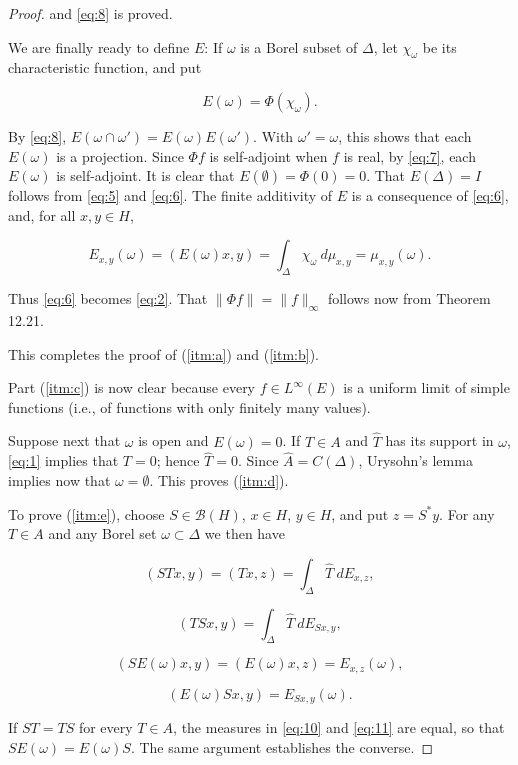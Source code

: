 \begin{proof}
  and \eqref{eq:8} is proved.

  We are finally ready to define \( E \): If \( \omega \) is a Borel subset of \( \Delta \), let
  \( \chi_{\omega} \) be its characteristic function, and put

  \[
    E(\omega) = \Phi(\chi_{\omega}).
  \]

  By \eqref{eq:8}, \( E(\omega \cap \omega') = E(\omega)E(\omega') \).
  With \( \omega' = \omega \), this shows that
  each \( E(\omega) \) is a projection.
  Since \( \Phi f \) is self-adjoint when \( f \) is real, by \eqref{eq:7},
  each \( E(\omega) \) is self-adjoint.
  It is clear that \( E(\emptyset) = \Phi(0) = 0 \).
  That
  \( E(\Delta) = I \) follows from \eqref{eq:5} and \eqref{eq:6}.
  The finite additivity of \( E \) is a consequence
  of \eqref{eq:6}, and, for all \( x, y \in H \),

  \[
    E_{x,y}(\omega) = (E(\omega)x, y) = \int_{\Delta} \chi_{\omega} \ d\mu_{x,y} = \mu_{x,y}(\omega).
  \]

  Thus \eqref{eq:6} becomes \eqref{eq:2}.
  That \( \|\Phi f\| = \|f\|_{\infty} \) follows now from Theorem 12.21.

  This completes the proof of (\ref{itm:a}) and (\ref{itm:b}).

  Part (\ref{itm:c}) is now clear because every \( f \in L^{\infty}(E) \) is a uniform limit of
  simple functions (i.e., of functions with only finitely many values).

  Suppose next that \( \omega \) is open and \( E(\omega) = 0 \).
  If \( T \in A \) and \( \widehat{T} \) has
  its support in \( \omega \), \eqref{eq:1} implies that \( T = 0 \); hence \( \widehat{T} = 0 \).
  Since \( \widehat{A} = C(\Delta) \),
  Urysohn's lemma implies now that \( \omega = \emptyset \).
  This proves (\ref{itm:d}).

  To prove (\ref{itm:e}), choose \( S \in \mathcal{B}(H) \), \( x \in H \), \( y \in H \), and put \( z = S^* y \).
  For any \( T \in A \) and any Borel set \( \omega \subset \Delta \) we then have

  \begin{equation}
    \label{eq:10}
    (STx, y) = (Tx, z) = \int_{\Delta} \widehat{T} \ dE_{x,z},
  \end{equation}

  \begin{equation}
    \label{eq:11}
    (TSx, y) = \int_{\Delta} \hat{T} \ dE_{Sx,y},
  \end{equation}

  \[
    (SE(\omega)x, y) = (E(\omega)x, z) = E_{x,z}(\omega),
  \]

  \[
    (E(\omega)Sx, y) = E_{Sx,y}(\omega).
  \]

  If \( ST = TS \) for every \( T \in A \), the measures in \eqref{eq:10} and \eqref{eq:11} are
  equal, so that \( SE(\omega) = E(\omega)S \).
  The same argument establishes the converse.
\end{proof}
